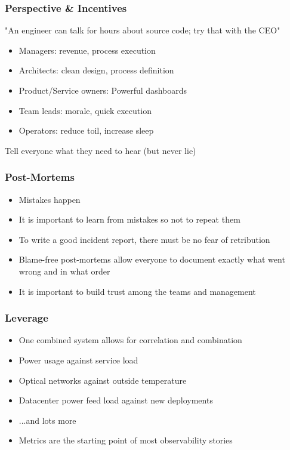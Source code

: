 \documentclass[aspectratio=169]{beamer}
\begin{document}
\begin{frame}
	\frametitle{Perspective \& Incentives}
	"An engineer can talk for hours about source code; try that with the CEO"
	\vfill
	\begin{itemize}
		\item Managers: revenue, process execution
		\item Architects: clean design, process definition
		\item Product/Service owners: Powerful dashboards
		\item Team leads: morale, quick execution
		\item Operators: reduce toil, increase sleep
	\end{itemize}
	\vfill
	Tell everyone what they need to hear (but never lie)
	\vfill
\end{frame}


\begin{frame}
	\frametitle{Post-Mortems}
	\begin{itemize}
		\item Mistakes happen
		\item It is important to learn from mistakes so not to repeat them
		\item To write a good incident report, there must be no fear of retribution
		\item Blame-free post-mortems allow everyone to document exactly what went wrong and in what order
		\item It is important to build trust among the teams and management
	\end{itemize}
\end{frame}

\begin{frame}
	\frametitle{Leverage}
	\begin{itemize}
		\item One combined system allows for correlation and combination
		\item Power usage against service load
		\item Optical networks against outside temperature
		\item Datacenter power feed load against new deployments
		\item ...and lots more
		\item Metrics are the starting point of most observability stories
	\end{itemize}
\end{frame}
\end{document}
